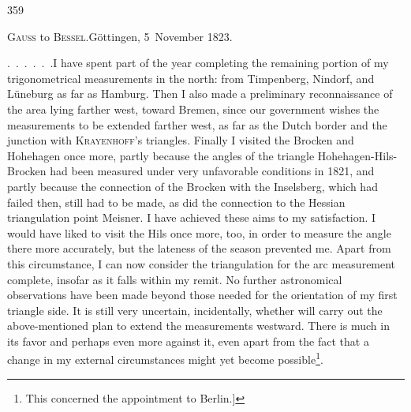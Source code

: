 \par\clearpage
{}\hfill359\par\medskip
\begin{center}
\textsc{Gauss} to \textsc{Bessel}.\quad Göttingen, 5~November 1823.
\end{center}
\begingroup
\makeatletter
\renewcommand{\@makefnmark}{\hbox{\normalfont[\textsuperscript{*})]}}
\long\def\@makefntext#1{\parindent1.5em\noindent[\textsuperscript{*})\ #1}
\makeatother

\par\noindent\hspace*{\parindent}.\ .\ .\ .\ .\ .\quad I have spent part of the year completing the remaining portion of my trigonometrical measurements in the north: from Timpenberg, Nindorf, and Lüneburg as far as Hamburg. Then I also made a preliminary reconnaissance of the area lying farther west, toward Bremen, since our government wishes the measurements to be extended farther west, as far as the Dutch border and the junction with \textsc{Krayenhoff}'s triangles. Finally I visited the Brocken and Hohehagen once more, partly because the angles of the triangle Hohehagen-Hils-Brocken had been measured under very unfavorable conditions in 1821, and partly because the connection of the Brocken with the Inselsberg, which had failed then, still had to be made, as did the connection to the Hessian triangulation point Meisner.
I have achieved these aims  to my satisfaction. I would have liked to visit the Hils once more, too, in order to measure the angle there more accurately, but the lateness of the season prevented me.
Apart from this circumstance, I can now consider the triangulation for the arc measurement complete, insofar as it falls within my remit.
No further astronomical observations have been made beyond those needed for the orientation of my first triangle side.
It is still very uncertain, incidentally, whether  will carry out the above-mentioned plan to extend the measurements westward.
There is much in its favor and perhaps even more against it, even apart from the fact that a change in my external circumstances might yet become possible\footnote{This concerned the appointment to Berlin.]}.\par

